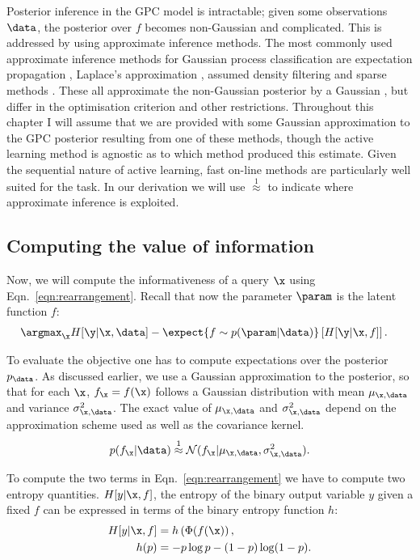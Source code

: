 Posterior inference in the GPC model is intractable; given some observations $\data$, the posterior over $f$ becomes non-Gaussian and complicated. This is addressed by using approximate inference methods. The most commonly used approximate inference methods for Gaussian process classification are expectation propagation \citep[EP,][]{Minka2002}, Laplace's approximation \citep{williams1998}, assumed density filtering \citep[ADF,][]{csato2000} and sparse methods \citep{candela05sparseGP}. These all approximate the non-Gaussian posterior by a Gaussian \citep{Nickisch2008}, but differ in the optimisation criterion and other restrictions. Throughout this chapter I will assume that we are provided with some Gaussian approximation to the GPC posterior resulting from one of these methods, though the active learning method is agnostic as to which method produced this estimate. Given the sequential nature of active learning, fast on-line methods \citep{Csato2002} are particularly well suited for the task. In our derivation we will use {\scriptsize$\stackrel{1}{\approx}$} to indicate where approximate inference is exploited.

\subsection{Computing the value of information}

Now, we will compute the informativeness of a query $\x$ using Eqn.\  \eqref{eqn:rearrangement}. Recall that now the parameter $\param$ is the latent function $f$:
%
\begin{align}
	&\argmax_{\x} H[\y \vert \x, \data] - \expect{f\sim p(\param|\data)} \left[ H[\y \vert \x,f] \right].
\end{align}

To evaluate the objective one has to compute expectations over the posterior $p_\data$. As discussed earlier, we use a Gaussian approximation to the posterior, so that for each $\x$, $f_{\x} = f(\x)$ follows a Gaussian distribution with mean $\mu_{\x,\data}$ and variance $\sigma_{\x,\data}^2$. The exact value of $\mu_{\x,\data}$ and $\sigma_{\x,\data}^2$ depend on the approximation scheme used as well as the covariance kernel.
%
\begin{align}
	p(f_{\x}\vert\data) \stackrel{1}{\approx} \mathcal{N}(f_{\x}\vert \mu_{\x,\data},\sigma_{\x,\data}^2) .
\end{align}

To compute the two terms in Eqn.\ \eqref{eqn:rearrangement} we have to compute two entropy quantities. $H[y\vert\x,f]$, the entropy of the binary output variable $y$ given a fixed $f$ can be expressed in terms of the binary entropy function $h$: 
\begin{align}
	H[y\vert\x,f] &= h\left(\Phi(f(\x)\right),\\
	h(p)	&=- p\log p - (1-p)\log(1-p).
\end{align}

